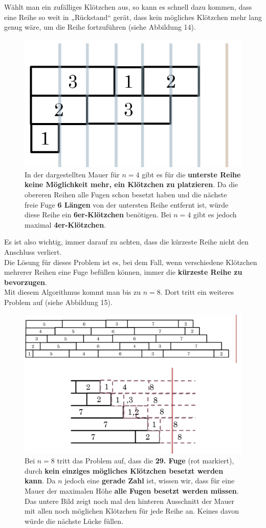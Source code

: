 \documentclass[a4paper,12pt]{article}
\begin{document}
Wählt man ein zufälliges Klötzchen aus, so kann es schnell dazu kommen, dass eine Reihe so weit in „Rückstand“ gerät, dass kein mögliches Klötzchen mehr lang genug wäre, um die Reihe fortzuführen (siehe Abbildung 14).
\begin{figure}[H]
    \centering
    \includegraphics[width=0.5\linewidth]{Bilder/Aufgabe1/Problem_Mauerbauart_02_RowSum.png}
    \caption{In der dargestellten Mauer für $n = 4$ gibt es für die \textbf{unterste Reihe keine Möglichkeit mehr, ein Klötzchen zu platzieren}. Da die obereren Reihen alle Fugen schon besetzt haben und die nächste freie Fuge \textbf{6 Längen} von der untersten Reihe entfernt ist, würde diese Reihe ein \textbf{6er-Klötzchen} benötigen. Bei $n = 4$ gibt es jedoch maximal \textbf{4er-Klötzchen}.}
\end{figure}
Es ist also wichtig, immer darauf zu achten, dass die kürzeste Reihe nicht den Anschluss verliert.
\\[0.4cm]
Die Lösung für dieses Problem ist es, bei dem Fall, wenn verschiedene Klötzchen mehrerer Reihen eine Fuge befüllen können, immer die \textbf{kürzeste Reihe zu bevorzugen}.
\\[0.4cm]
Mit diesem Algorithmus kommt man bis zu $n = 8$. Dort tritt ein weiteres Problem auf (siehe Abbildung 15).
\begin{figure}[H]
    \centering
    \includegraphics[width=1\linewidth]{Bilder/Aufgabe1/Problem_Mauerbauart_02_Kein_Klotz.png}
    \caption{Bei $n = 8$ tritt das Problem auf, dass die \textbf{29. Fuge} (rot markiert), durch \textbf{kein einziges mögliches Klötzchen besetzt werden kann}. Da $n$ jedoch eine \textbf{gerade Zahl} ist, wissen wir, dass für eine Mauer der maximalen Höhe \textbf{alle Fugen besetzt werden müssen}. Das untere Bild zeigt noch mal den hinteren Ausschnitt der Mauer mit allen noch möglichen Klötzchen für jede Reihe an. Keines davon würde die nächste Lücke füllen.}
\end{figure}
\end{document}
